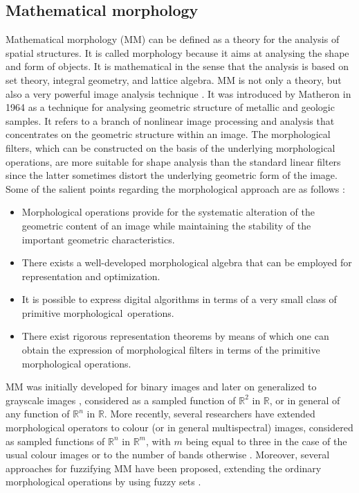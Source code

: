 \documentclass[final,a4paper,12pt,english]{UnicaPhdThesis3}
\begin{document}
\subsection{Mathematical morphology} %
Mathematical morphology (MM) can be defined as a theory for the analysis of spatial structures. It is called morphology because it aims at analysing the shape and form of objects. It is mathematical in the sense that the analysis is based on set theory, integral geometry, and lattice algebra. MM is not only a theory, but also a very powerful image analysis technique \cite{Soille2004}.
It was introduced by Matheron in 1964 as a technique for analysing geometric structure of metallic and geologic samples. It refers to a branch of nonlinear image processing and analysis that concentrates on the geometric structure within an image.
The morphological filters, which can be constructed on the basis of the underlying morphological operations, are more suitable for shape analysis than the standard linear filters since the latter sometimes distort the underlying geometric form of the image. Some of the salient points regarding the morphological approach are as follows \cite{Giardina1988}:
\begin{itemize}
	\item Morphological operations provide for the systematic alteration of the geometric content of an image while maintaining the stability of the important geometric characteristics.
	\item There exists a well-developed morphological algebra that can be employed for representation and optimization.
	\item It is possible to express digital algorithms in terms of a very small class of primitive morphological~operations.
	\item There exist rigorous representation theorems by means of which one can obtain the expression of morphological filters in terms of the primitive morphological operations.
\end{itemize}

MM was initially developed for binary images and later on generalized to grayscale images \cite{Soille2004,Serra1984}, considered as a sampled function of $\mathbb{R}^{2}$ in $\mathbb{R}$, or in general of any function of $\mathbb{R}^{n}$ in $\mathbb{R}$.
More recently, several researchers have extended morphological operators to colour (or in general multispectral) images, considered as sampled functions of $\mathbb{R}^{n}$ in $\mathbb{R}^{m}$, with $m$ being equal to three in the case of the usual colour images or to the number of bands otherwise \cite{Benavent2012}.  Moreover, several approaches for fuzzifying MM have been proposed, extending the ordinary  morphological operations by using fuzzy sets \cite{Kerre2000}.
\end{document}
